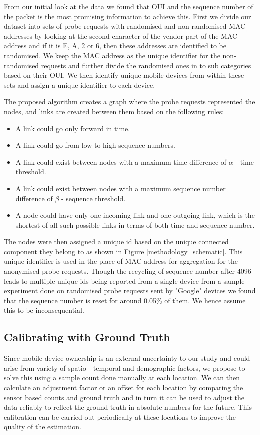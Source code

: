 From our initial look at the data we found that OUI and the sequence
number of the packet is the most promising information to achieve this.
First we divide our dataset into sets of probe requests with randomised and
non-randomised MAC addresses by looking at the second character of the vendor
part of the MAC address and if it is E, A, 2 or 6, then these addresses are
identified to be randomised. We keep the MAC address as the unique
identifier for the non-randomised requests and further divide the randomised ones in to
sub categories based on their OUI. We then  
identify unique mobile devices from within these sets and assign a unique identifier to each device.

The proposed algorithm creates a graph where the probe requests represented the
nodes, and links are created between them based on the following rules:

\begin{itemize} 
\item A link could go only forward in time. 
\item A link could go from low to high sequence numbers. 
\item A link could exist between nodes with a maximum time difference of
	$\alpha$ - time threshold. 
\item A link could exist between nodes with a maximum sequence number
	difference of $\beta$ - sequence threshold.
\item A node could have only one incoming link and one outgoing link, which is
	the shortest of all such possible links in terms of both time and sequence
	number.
\end{itemize}

The nodes were then assigned a unique id based on the unique connected component
they belong to as shown in Figure \ref{methodology_schematic}. This unique
identifier is used in the place of MAC address for aggregation for the
anonymised probe requests. Though the recycling of sequence number after 4096
leads to multiple unique ids being reported from a single device from a sample
experiment done on randomised probe requests sent by "Google" devices we found
that the sequence number is reset for around 0.05\% of them. We hence assume
this to be inconsequential. 

\subsection{Calibrating with Ground Truth} 

Since mobile device ownership is an external uncertainty to our study and could
arise from variety of spatio - temporal and demographic factors, we propose to
solve this using a sample count done manually at each location.  We can then
calculate an  adjustment factor or an offset for each location by comparing the
sensor based counts and ground truth and in turn it can be used to adjust the
data reliably to reflect the ground truth in absolute numbers for the future.
This calibration can be carried out periodically at these locations to improve
the quality of the estimation.
